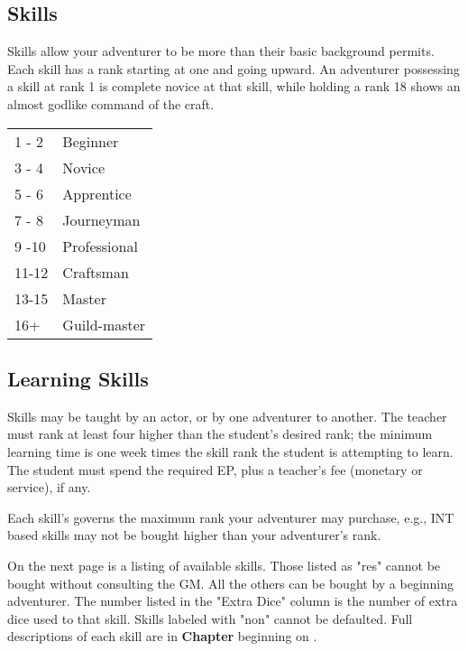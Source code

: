 \begin{multicols*}{2}
\section{Skills}
\begin{multicols*}{2}
Skills allow your adventurer to be more than their basic background permits. Each skill has a rank starting at one and going upward. An adventurer possessing a skill at rank 1 is complete novice at that skill, while holding a rank 18 shows an almost godlike command of the craft.
\begin{normbox}
\begin{tabular}{l l}
1 - 2 & Beginner\\
3 - 4 & Novice\\
5 - 6 & Apprentice\\
7 - 8 & Journeyman\\
9 -10 & Professional\\
11-12 & Craftsman\\
13-15 & Master\\
16+ & Guild-master\\
\end{tabular}
\end{normbox}
\end{multicols*}
\subsection{Learning Skills}
Skills may be taught by an actor, or by one adventurer to another. The teacher must rank at least four higher than the student's desired rank; the minimum learning time is one week times the skill rank the student is attempting to learn. The student must spend the required EP, plus a teacher's fee (monetary or service), if any.

Each skill's  governs the maximum rank your adventurer may purchase, e.g., INT based skills may not be bought higher than your adventurer's \INT rank.

On the next page is a listing of available skills. Those listed as "res" cannot be bought without consulting the GM. All the others can be bought by a beginning adventurer. The number listed in the "Extra Dice" column is the number of extra dice used to  that skill. Skills labeled with "non" cannot be defaulted. Full descriptions of each skill are in \textbf{Chapter } beginning on \tcpage{\pageref{ch:skills}}.
\label{create-skills}
\begin{tcbraster}[raster columns=1,boxrule=0pt,title=\textbf{Skills},left=0pt,right=0pt,top=0pt,bottom=0pt,boxsep=0pt,boxrule=0.6pt,lefttitle=2.5mm,toptitle=1mm,bottomtitle=1mm,colbacktitle=Navy,colback=white]
\end{tcbraster}

\end{multicols*}

